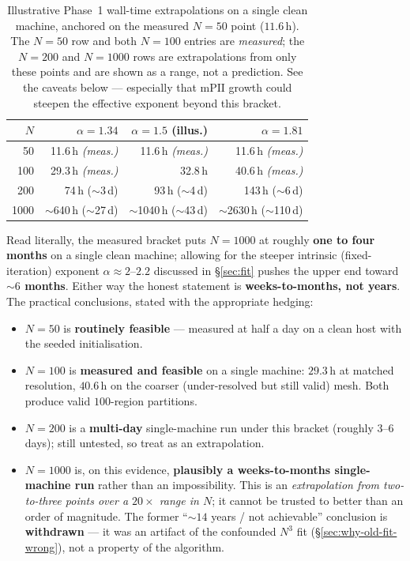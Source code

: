 \documentclass[11pt,a4paper]{article}
\begin{document}
\begin{table}[H]
\centering
\caption{Illustrative Phase~1 wall-time extrapolations on a single clean
machine, anchored on the measured $N=50$ point ($11.6$\,h).  The $N=50$ row and
both $N=100$ entries are \emph{measured}; the $N=200$ and $N=1000$ rows are
extrapolations from only these points and are shown as a range, not a
prediction.  See the caveats below --- especially that $\mathrm{mPII}$ growth
could steepen the effective exponent beyond this bracket.}
\label{tab:projections}
\renewcommand{\arraystretch}{1.3}
\begin{tabular}{rrrr}
\toprule
$N$ & $\alpha=1.34$ & $\alpha=1.5$ (illus.) & $\alpha=1.81$ \\
\midrule
\phantom{0}50   & 11.6\,h \emph{(meas.)} & 11.6\,h \emph{(meas.)} & 11.6\,h \emph{(meas.)} \\
100  & 29.3\,h \emph{(meas.)} & 32.8\,h & 40.6\,h \emph{(meas.)} \\
200  & 74\,h ($\sim$3\,d)   & 93\,h ($\sim$4\,d)   & 143\,h ($\sim$6\,d) \\
1000 & $\sim$640\,h ($\sim$27\,d) & $\sim$1040\,h ($\sim$43\,d) & $\sim$2630\,h ($\sim$110\,d) \\
\bottomrule
\end{tabular}
\end{table}

\noindent Read literally, the measured bracket puts $N=1000$ at roughly
\textbf{one to four months} on a single clean machine; allowing for the steeper
intrinsic (fixed-iteration) exponent $\alpha\approx2$--$2.2$ discussed in
\S\ref{sec:fit} pushes the upper end toward \textbf{$\sim\!6$ months}.  Either
way the honest statement is \textbf{weeks-to-months, not years}.  The practical
conclusions, stated with the appropriate hedging:
\begin{itemize}
  \item $N=50$ is \textbf{routinely feasible} --- measured at half a day on a
    clean host with the seeded initialisation.
  \item $N=100$ is \textbf{measured and feasible} on a single machine: $29.3$\,h
    at matched resolution, $40.6$\,h on the coarser (under-resolved but still
    valid) mesh.  Both produce valid $100$-region partitions.
  \item $N=200$ is a \textbf{multi-day} single-machine run under this bracket
    (roughly $3$--$6$ days); still untested, so treat as an extrapolation.
  \item $N=1000$ is, on this evidence, \textbf{plausibly a weeks-to-months
    single-machine run} rather than an impossibility.  This is an
    \emph{extrapolation from two-to-three points over a $20\times$ range in
    $N$}; it cannot be trusted to better than an order of magnitude.  The
    former ``$\sim\!14$ years / not achievable'' conclusion is
    \textbf{withdrawn} --- it was an artifact of the confounded $N^3$ fit
    (\S\ref{sec:why-old-fit-wrong}), not a property of the algorithm.
\end{itemize}
\end{document}
